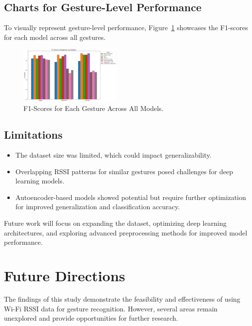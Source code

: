 \documentclass[10pt,twocolumn,letterpaper]{article}
\begin{document}
\subsection{Charts for Gesture-Level Performance}

To visually represent gesture-level performance, Figure~\ref{fig:f1_per_gesture} showcases the F1-scores for each model across all gestures.

\begin{figure}[h]
  \centering
  \includegraphics[width=0.45\textwidth]{figures/f1_per_gesture_chart.png}
  \caption{F1-Scores for Each Gesture Across All Models.}
  \label{fig:f1_per_gesture}
\end{figure}

\subsection{Limitations}

\begin{itemize}
  \item The dataset size was limited, which could impact generalizability.
  \item Overlapping RSSI patterns for similar gestures posed challenges for deep learning models.
  \item Autoencoder-based models showed potential but require further optimization for improved generalization and classification accuracy.
\end{itemize}

Future work will focus on expanding the dataset, optimizing deep learning architectures, and exploring advanced preprocessing methods for improved model performance.




\section{Future Directions}

The findings of this study demonstrate the feasibility and effectiveness of using Wi-Fi RSSI data for gesture recognition. However, several areas remain unexplored and provide opportunities for further research.
\end{document}
